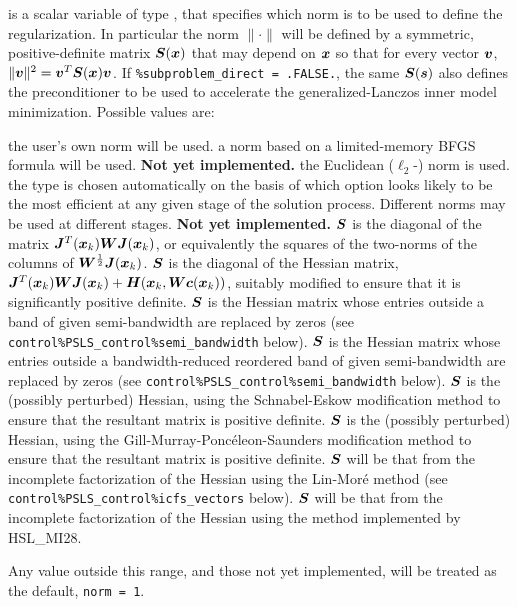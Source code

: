 \documentclass{galahad}
\begin{document}
\begin{description}
 is a scalar variable of type \integer,
that specifies which norm is to be used to define the regularization.
In particular the norm $\|\cdot\|$ will be defined by a symmetric,
positive-definite matrix ${\bm{S}}({\bm{x}})$ that may depend on ${\bm{x}}$
so that for every vector ${\bm{v}}$, $\|{\bm{v}}\|^2 = {\bm{v}}^T {\bm{S}}({\bm{x}}) {\bm{v}}$.
If {\tt \%subproblem\_direct = .FALSE.}, the same ${\bm{S}}({\bm{s}})$ also defines the
preconditioner to be used to accelerate the generalized-Lanczos
inner model minimization.  Possible values are:


\begin{description}
 the user's own norm will be used.
 a norm based on a limited-memory BFGS formula will be used.
        {\bf Not yet implemented.}
 the Euclidean ($\ell_2$-) norm is used.
 the type is chosen automatically on the basis of which option looks
        likely to be the most efficient at any given stage of the solution
        process. Different norms may be used at different stages.
        {\bf Not yet implemented.}
 ${\bm{S}}$ is the diagonal of the matrix ${\bm{J}}^T({\bm{x}}_k) {\bm{W}} {\bm{J}}({\bm{x}}_k)$,
        or equivalently the squares of the two-norms of the columns of
        ${\bm{W}}^{{\scriptstyle \frac{1}{2}}} {\bm{J}}({\bm{x}}_k)$.
 ${\bm{S}}$ is the diagonal of the Hessian matrix,
        ${\bm{J}}^T({\bm{x}}_k) {\bm{W}} {\bm{J}}({\bm{x}}_k) + {\bm{H}}({\bm{x}}_k,{\bm{W}}{\bm{c}}({\bm{x}}_k))$,
        suitably modified to ensure that it is significantly positive definite.
 ${\bm{S}}$ is the Hessian matrix whose entries outside a band of
         given semi-bandwidth are replaced by zeros
        (see {\tt control\%PSLS\_control\%semi\_bandwidth} below).
 ${\bm{S}}$ is the Hessian matrix whose entries outside a
        bandwidth-reduced reordered band of given semi-bandwidth are
        replaced by zeros
        (see {\tt control\%PSLS\_control\%semi\_bandwidth} below).
 ${\bm{S}}$ is the (possibly perturbed) Hessian,
         using the Schnabel-Eskow modification
        method to ensure that the resultant matrix is positive definite.
 ${\bm{S}}$ is the (possibly perturbed) Hessian,
        using the Gill-Murray-Ponc\'{e}leon-Saunders
        modification method to ensure that the resultant matrix is
        positive definite.
 ${\bm{S}}$ will be that from the incomplete factorization of the Hessian
        using the Lin-Mor\'{e} method
        (see {\tt control\%PSLS\-\_control\%icfs\_vectors} below).
 ${\bm{S}}$ will be that from the incomplete factorization of the Hessian
        using the method implemented by HSL\_MI28.
\end{description}
Any value outside this range, and those not yet implemented, will be
treated as the default, {\tt norm = 1}.


\end{description}
\end{document}
